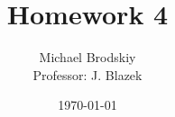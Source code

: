 


\title{Homework 4}
\date{\today}
\author{Michael Brodskiy\\ \small Professor: J. Blazek}



\maketitle

